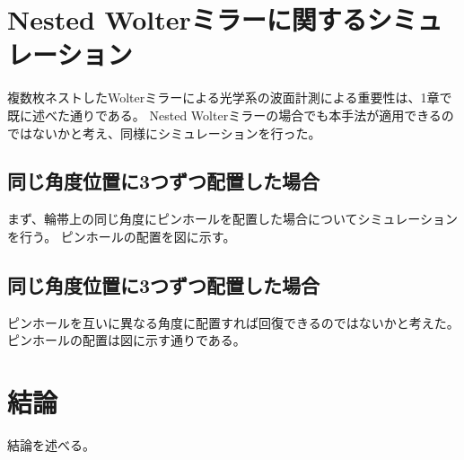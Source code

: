 \section{Nested Wolterミラーに関するシミュレーション}
\label{chap3_nested_transverse_simulation}

複数枚ネストしたWolterミラーによる光学系の波面計測による重要性は、1章で既に述べた通りである。
Nested Wolterミラーの場合でも本手法が適用できるのではないかと考え、同様にシミュレーションを行った。

\subsection{同じ角度位置に3つずつ配置した場合}
\label{chap3_nested_transverse_same_angle}

まず、輪帯上の同じ角度にピンホールを配置した場合についてシミュレーションを行う。
ピンホールの配置を図に示す。


\subsection{同じ角度位置に3つずつ配置した場合}
\label{chap3_nested_transverse_different_angle}

ピンホールを互いに異なる角度に配置すれば回復できるのではないかと考えた。
ピンホールの配置は図に示す通りである。


\clearpage
\newpage



\section{結論}
\label{chap3_conclusion}
結論を述べる。


